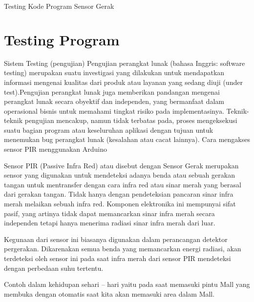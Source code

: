 
Testing Kode Program Sensor Gerak

\section {Testing Program}
Sistem Testing (pengujian)
Pengujian perangkat lunak (bahasa Inggris: software testing) merupakan suatu investigasi yang dilakukan untuk mendapatkan informasi mengenai kualitas dari produk atau layanan yang sedang diuji (under test).Pengujian perangkat lunak juga memberikan pandangan mengenai perangkat lunak secara obyektif dan independen, yang bermanfaat dalam operasional bisnis untuk memahami tingkat risiko pada implementasinya. Teknik-teknik pengujian mencakup, namun tidak terbatas pada, proses mengeksekusi suatu bagian program atau keseluruhan aplikasi dengan tujuan untuk menemukan bug perangkat lunak (kesalahan atau cacat lainnya).
Cara mengakses sensor PIR menggunakan Arduino

Sensor PIR (Passive Infra Red) atau disebut dengan Sensor Gerak merupakan sensor yang digunakan untuk mendeteksi adanya benda atau sebuah gerakan tangan untuk mentransfer dengan cara infra red atau sinar merah yang berasal dari gerakan tangan. Tidak hanya dengan pendeteksian pancaran sinar infra merah melaikan sebuah infra red.
Komponen elektronika ini mempunyai sifat pasif, yang artinya tidak dapat memancarkan sinar infra merah secara independen tetapi hanya menerima radiasi sinar infra merah dari luar.

Kegunaan dari sensor ini biasanya digunakan dalam perancangan detektor pergerakan. Dikarenakan semua benda yang memancarkan energi radiasi, akan terdeteksi oleh sensor ini pada saat infra merah dari sensor PIR mendeteksi dengan perbedaan suhu tertentu.

Contoh dalam kehidupan sehari – hari yaitu pada saat memasuki pintu Mall yang membuka dengan otomatis saat kita akan memasuki area dalam Mall.
